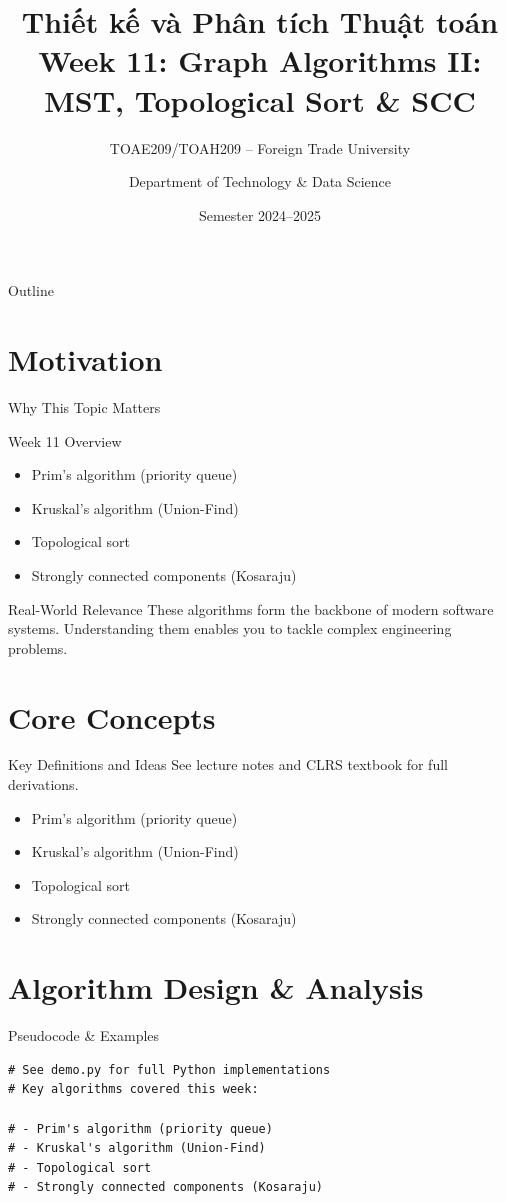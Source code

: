 \documentclass[aspectratio=169,xcolor=dvipsnames]{beamer}
\title[Algorithms -- Week 11]{\textbf{Thiết kế và Phân tích Thuật toán}\\
  \large Week 11: Graph Algorithms II: MST, Topological Sort & SCC}
\subtitle{TOAE209/TOAH209 -- Foreign Trade University}
\author{Department of Technology \& Data Science}
\date{Semester 2024--2025}
\begin{document}
\begin{frame}\titlepage\end{frame}
\begin{frame}{Outline}\tableofcontents\end{frame}

\section{Motivation}
\begin{frame}{Why This Topic Matters}
  \begin{block}{Week 11 Overview}
    \begin{itemize}
    \item Prim's algorithm (priority queue)
    \item Kruskal's algorithm (Union-Find)
    \item Topological sort
    \item Strongly connected components (Kosaraju)
    \end{itemize}
  \end{block}
  \begin{exampleblock}{Real-World Relevance}
    These algorithms form the backbone of modern software systems.
    Understanding them enables you to tackle complex engineering problems.
  \end{exampleblock}
\end{frame}

\section{Core Concepts}
\begin{frame}{Key Definitions and Ideas}
  See lecture notes and CLRS textbook for full derivations.
  \begin{itemize}
    \item Prim's algorithm (priority queue)
    \item Kruskal's algorithm (Union-Find)
    \item Topological sort
    \item Strongly connected components (Kosaraju)
  \end{itemize}
\end{frame}

\section{Algorithm Design \& Analysis}
\begin{frame}[fragile]{Pseudocode \& Examples}
  \begin{lstlisting}
# See demo.py for full Python implementations
# Key algorithms covered this week:

# - Prim's algorithm (priority queue)
# - Kruskal's algorithm (Union-Find)
# - Topological sort
# - Strongly connected components (Kosaraju)
  \end{lstlisting}
\end{frame}
\end{document}
